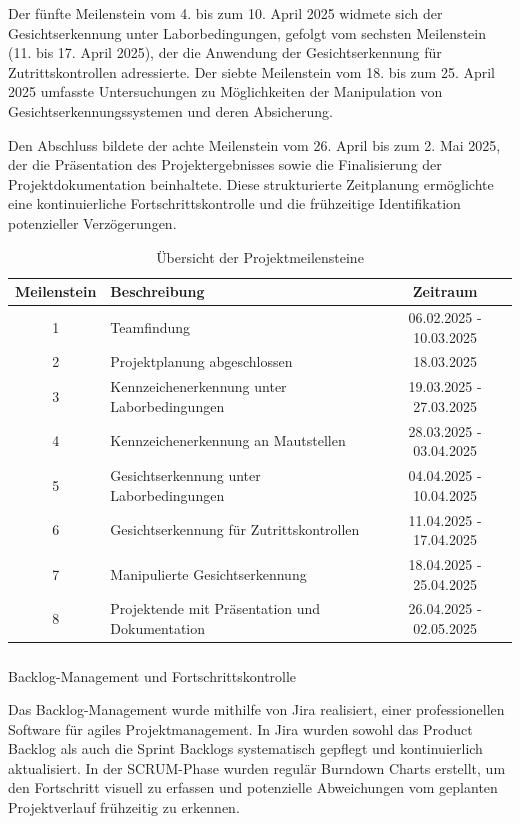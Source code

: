 Der fünfte Meilenstein vom 4. bis zum 10. April 2025 widmete sich der Gesichtserkennung unter Laborbedingungen, gefolgt vom sechsten Meilenstein (11. bis 17. April 2025), der die Anwendung der Gesichtserkennung für Zutrittskontrollen adressierte. Der siebte Meilenstein vom 18. bis zum 25. April 2025 umfasste Untersuchungen zu Möglichkeiten der Manipulation von Gesichtserkennungssystemen und deren Absicherung.

Den Abschluss bildete der achte Meilenstein vom 26. April bis zum 2. Mai 2025, der die Präsentation des Projektergebnisses sowie die Finalisierung der Projektdokumentation beinhaltete. Diese strukturierte Zeitplanung ermöglichte eine kontinuierliche Fortschrittskontrolle und die frühzeitige Identifikation potenzieller Verzögerungen.

\begin{table}[h]
    \centering
    \begin{tabular}{|c|l|c|}
        \hline
        \textbf{Meilenstein} & \textbf{Beschreibung} & \textbf{Zeitraum} \\
        \hline
        1 & Teamfindung & 06.02.2025 - 10.03.2025 \\
        \hline
        2 & Projektplanung abgeschlossen & 18.03.2025 \\
        \hline
        3 & Kennzeichenerkennung unter Laborbedingungen & 19.03.2025 - 27.03.2025 \\
        \hline
        4 & Kennzeichenerkennung an Mautstellen & 28.03.2025 - 03.04.2025 \\
        \hline
        5 & Gesichtserkennung unter Laborbedingungen & 04.04.2025 - 10.04.2025 \\
        \hline
        6 & Gesichtserkennung für Zutrittskontrollen & 11.04.2025 - 17.04.2025 \\
        \hline
        7 & Manipulierte Gesichtserkennung & 18.04.2025 - 25.04.2025 \\
        \hline
        8 & Projektende mit Präsentation und Dokumentation & 26.04.2025 - 02.05.2025 \\
        \hline
    \end{tabular}
    \caption{Übersicht der Projektmeilensteine}
    \label{tab:milestones}
\end{table}

\subparagraph{}{Backlog-Management und Fortschrittskontrolle}

Das Backlog-Management wurde mithilfe von Jira realisiert, einer professionellen Software für agiles Projektmanagement. In Jira wurden sowohl das Product Backlog als auch die Sprint Backlogs systematisch gepflegt und kontinuierlich aktualisiert. In der SCRUM-Phase wurden regulär Burndown Charts erstellt, um den Fortschritt visuell zu erfassen und potenzielle Abweichungen vom geplanten Projektverlauf frühzeitig zu erkennen.

